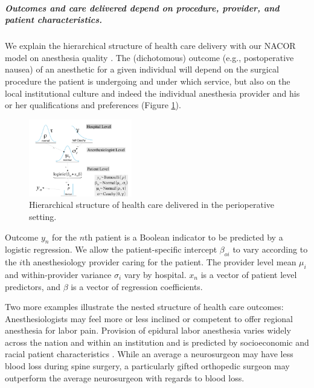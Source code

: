 \documentclass[11pt,notitlepage]{article}
\begin{document}
\subparagraph*{Outcomes and care delivered depend on procedure, provider, and patient characteristics.} 
We explain the hierarchical structure of health care delivery with our NACOR model on anesthesia quality \cite{AndreaeWhite2015}. 
The (dichotomous) outcome (e.g., postoperative nausea) of 
an anesthetic for a given individual will depend on the surgical procedure the patient is undergoing and under 
which service, but also on the local institutional culture and indeed the individual anesthesia provider and 
his or her qualifications and preferences (Figure \ref{fig:NACOR}).

\begin{figure} 
\vspace*{-12pt}
\includegraphics[width=0.4\textwidth]{Figures/DistrogramNACOR.pdf} 
\caption{Hierarchical structure of health care delivered in the perioperative setting.}
\label{fig:NACOR}
\vspace*{-12pt}
\end{figure} 

Outcome $y_n$ for the $n$th patient is a Boolean indicator to be predicted by a logistic regression. We allow the patient-specific
intercept $\beta_{oi}$ to vary according to the $i$th anesthesiology provider caring for the patient. The provider level mean 
$\mu_i$ and within-provider variance $\sigma_i$ vary by hospital. $x_n$ is a vector of patient level predictors, and $\beta$ is a vector 
of regression coefficients.  

Two more examples illustrate the nested structure of health care outcomes: 
Anesthesiologists may feel more or less inclined or competent to offer 
regional anesthesia for labor pain. Provision of epidural labor 
anesthesia varies widely across the nation and within an institution and 
is predicted by socioeconomic and racial patient characteristics 
\cite{Rust2004,Glance2007}.  
While an average a neurosurgeon may have less blood loss during spine 
surgery, a particularly gifted orthopedic surgeon may outperform the 
average neurosurgeon with regards to blood loss.
\end{document}
